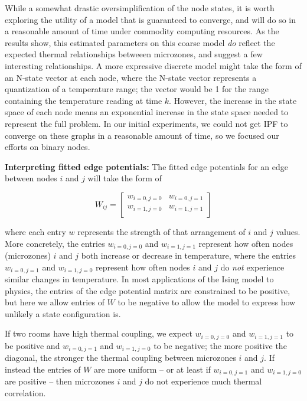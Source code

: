 While a somewhat drastic oversimplification of the node states, it is worth exploring the utility of a model that is guaranteed to converge, and will do so in a reasonable amount of time under commodity computing resources.
As the results show, this estimated parameters on this coarse model \emph{do} reflect the expected thermal relationships betweeen microzones, and suggest a few interesting relationships.
A more expressive discrete model might take the form of an N-state vector at each node, where the N-state vector represents a quantization of a temperature range; the vector would be 1 for the range containing the temperature reading at time $k$.
However, the increase in the state space of each node means an exponential increase in the state space needed to represent the full problem.
In our initial experiments, we could not get IPF to converge on these graphs in a reasonable amount of time, so we focused our efforts on binary nodes.

\textbf{Interpreting fitted edge potentials:} The fitted edge potentials for an edge between nodes $i$ and $j$ will take the form of

\begin{equation}\label{eq:W}
W_{ij} =
\begin{bmatrix}
w_{i=0,j=0} & w_{i=0,j=1} \\
w_{i=1,j=0} & w_{i=1,j=1} \\
\end{bmatrix}
\end{equation}

where each entry $w$ represents the strength of that arrangement of $i$ and $j$ values.
More concretely, the entries $w_{i=0,j=0}$ and $w_{i=1,j=1}$ represent how often nodes (microzones) $i$ and $j$ both increase or decrease in temperature, where the entries $w_{i=0,j=1}$ and $w_{i=1,j=0}$ represent how often nodes $i$ and $j$ do \emph{not} experience similar changes in temperature.
In most applications of the Ising model to physics, the entries of the edge potential matrix are constrained to be positive, but here we allow entries of $W$ to be negative to allow the model to express how unlikely a state configuration is.

If two rooms have high thermal coupling, we expect $w_{i=0,j=0}$ and $w_{i=1,j=1}$ to be positive and $w_{i=0,j=1}$ and $w_{i=1,j=0}$ to be negative; the more positive the diagonal, the stronger the thermal coupling between microzones $i$ and $j$.
If instead the entries of $W$ are more uniform -- or at least if $w_{i=0,j=1}$ and $w_{i=1,j=0}$ are positive -- then microzones $i$ and $j$ do not experience much thermal correlation.

